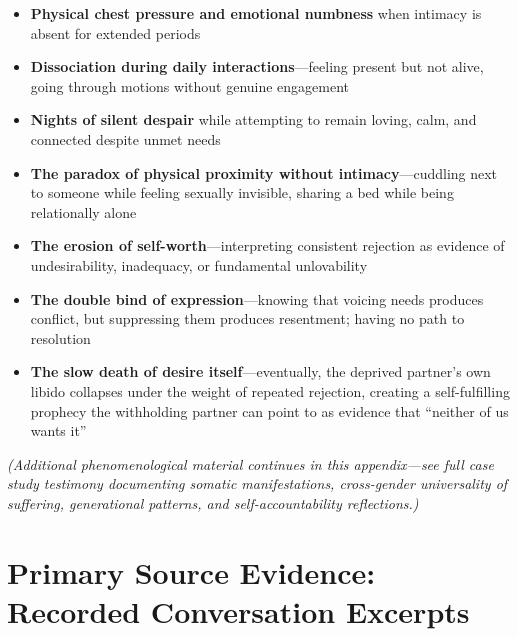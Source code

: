 \documentclass[12pt,openany]{book}
\numberwithin{equation}{chapter}
\begin{document}
\begin{itemize}
    \item \textbf{Physical chest pressure and emotional numbness} when intimacy is absent for extended periods
    
    \item \textbf{Dissociation during daily interactions}---feeling present but not alive, going through motions without genuine engagement
    
    \item \textbf{Nights of silent despair} while attempting to remain loving, calm, and connected despite unmet needs
    
    \item \textbf{The paradox of physical proximity without intimacy}---cuddling next to someone while feeling sexually invisible, sharing a bed while being relationally alone
    
    \item \textbf{The erosion of self-worth}---interpreting consistent rejection as evidence of undesirability, inadequacy, or fundamental unlovability
    
    \item \textbf{The double bind of expression}---knowing that voicing needs produces conflict, but suppressing them produces resentment; having no path to resolution
    
    \item \textbf{The slow death of desire itself}---eventually, the deprived partner's own libido collapses under the weight of repeated rejection, creating a self-fulfilling prophecy the withholding partner can point to as evidence that ``neither of us wants it''
\end{itemize}

\textit{(Additional phenomenological material continues in this appendix---see full case study testimony documenting somatic manifestations, cross-gender universality of suffering, generational patterns, and self-accountability reflections.)}

\vspace{1.5em}

\chapter{Primary Source Evidence: Recorded Conversation Excerpts}
\end{document}
